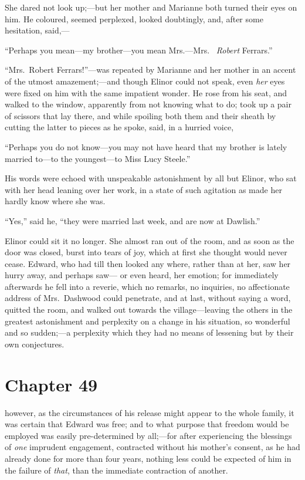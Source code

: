 She dared not look up;---but her mother and Marianne both
turned their eyes on him.  He coloured, seemed perplexed,
looked doubtingly, and, after some hesitation, said,---%

``Perhaps you mean---my brother---you mean Mrs.---Mrs.\ %
\emph{Robert} Ferrars.''

``Mrs.\ Robert Ferrars!''---was repeated by Marianne and her
mother in an accent of the utmost amazement;---and though
Elinor could not speak, even \emph{her} eyes were fixed on him
with the same impatient wonder.  He rose from his seat,
and walked to the window, apparently from not knowing
what to do; took up a pair of scissors that lay there,
and while spoiling both them and their sheath by cutting
the latter to pieces as he spoke, said, in a hurried voice,

``Perhaps you do not know---you may not have heard
that my brother is lately married to---to the youngest---to
Miss Lucy Steele.''

His words were echoed with unspeakable astonishment
by all but Elinor, who sat with her head leaning over
her work, in a state of such agitation as made her hardly
know where she was.

``Yes,'' said he, ``they were married last week,
and are now at Dawlish.''

Elinor could sit it no longer.  She almost ran
out of the room, and as soon as the door was closed,
burst into tears of joy, which at first she thought would
never cease.  Edward, who had till then looked any where,
rather than at her, saw her hurry away, and perhaps saw---%
or even heard, her emotion; for immediately afterwards
he fell into a reverie, which no remarks, no inquiries,
no affectionate address of Mrs.\ Dashwood could penetrate,
and at last, without saying a word, quitted the room,
and walked out towards the village---leaving the others
in the greatest astonishment and perplexity on a change
in his situation, so wonderful and so sudden;---a perplexity
which they had no means of lessening but by their
own conjectures.



\chapter{Chapter 49}


 however, as the circumstances of his
release might appear to the whole family, it was certain
that Edward was free; and to what purpose that freedom would
be employed was easily pre-determined by all;---for after
experiencing the blessings of \emph{one} imprudent engagement,
contracted without his mother's consent, as he had already
done for more than four years, nothing less could be expected
of him in the failure of \emph{that}, than the immediate contraction
of another.

